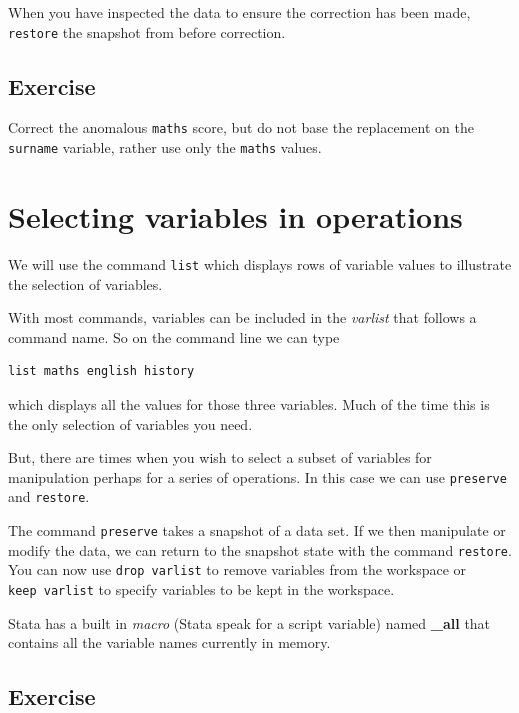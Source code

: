 \documentclass[
]{article}
\begin{document}
When you have inspected the data to ensure the correction has been made, \texttt{restore} the snapshot from before correction.

\hypertarget{exercise-6}{%
\subsection{Exercise}\label{exercise-6}}

Correct the anomalous \texttt{maths} score, but do not base the replacement on the \texttt{surname} variable, rather use only the \texttt{maths} values.

\hypertarget{selecting-variables-in-operations}{%
\section{Selecting variables in operations}\label{selecting-variables-in-operations}}

We will use the command \texttt{list} which displays rows of variable values to illustrate the selection of variables.

With most commands, variables can be included in the \emph{varlist} that follows a command name. So on the command line we can type

\begin{verbatim}
list maths english history
\end{verbatim}

which displays all the values for those three variables. Much of the time this is the only selection of variables you need.

But, there are times when you wish to select a subset of variables for manipulation perhaps for a series of operations. In this case we can use \texttt{preserve} and \texttt{restore}.

The command \texttt{preserve} takes a snapshot of a data set. If we then manipulate or modify the data, we can return to the snapshot state with the command \texttt{restore}. You can now use \texttt{drop\ varlist} to remove variables from the workspace or \texttt{keep\ varlist} to specify variables to be kept in the workspace.

Stata has a built in \emph{macro} (Stata speak for a script variable) named \textbf{\_all} that contains all the variable names currently in memory.

\hypertarget{exercise-7}{%
\subsection{Exercise}\label{exercise-7}}
\end{document}
